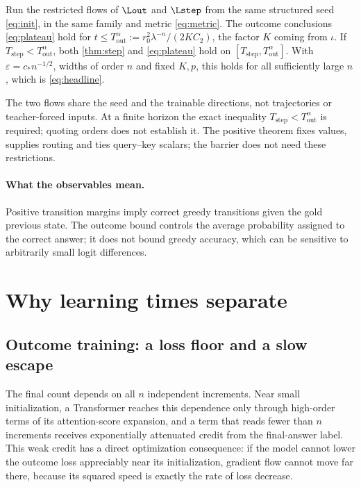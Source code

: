 \begin{corollary}\label{cor:matched}\label{thm:matched}
Run the restricted flows of $\Lout$ and $\Lstep$ from the same structured seed \cref{eq:init}, in the same family and metric \cref{eq:metric}. The outcome conclusions \cref{eq:plateau} hold for $t\le T_{\mathrm{out}}^\alpha:=r_0^2\lambda^{-n}/(2KC_2)$, the factor $K$ coming from $\iota$. If $T_{\mathrm{step}}<T_{\mathrm{out}}^\alpha$, both \cref{thm:step} and \cref{eq:plateau} hold on $[T_{\mathrm{step}},T_{\mathrm{out}}^\alpha]$. With $\varepsilon=c_*n^{-1/2}$, widths of order $n$ and fixed $K,p$, this holds for all sufficiently large $n$, which is \cref{eq:headline}.
\end{corollary}
The two flows share the seed and the trainable directions, not trajectories or teacher-forced inputs. At a finite horizon the exact inequality $T_{\mathrm{step}}<T_{\mathrm{out}}^\alpha$ is required; quoting orders does not establish it. The positive theorem fixes values, supplies routing and ties query--key scalars; the barrier does not need these restrictions.

\paragraph{What the observables mean.}
Positive transition margins imply correct greedy transitions given the gold previous state. The outcome bound controls the average probability assigned to the correct answer; it does not bound greedy accuracy, which can be sensitive to arbitrarily small logit differences.

\section{Why learning times separate}\label{sec:credit}
\subsection{Outcome training: a loss floor and a slow escape}
The final count depends on all $n$ independent increments. Near small initialization, a Transformer reaches this dependence only through high-order terms of its attention-score expansion, and a term that reads fewer than $n$ increments receives exponentially attenuated credit from the final-answer label. This weak credit has a direct optimization consequence: if the model cannot lower the outcome loss appreciably near its initialization, gradient flow cannot move far there, because its squared speed is exactly the rate of loss decrease.


